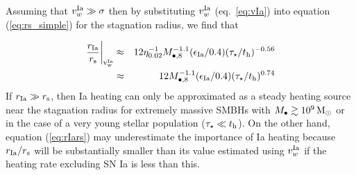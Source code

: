 \documentclass[usenatbib,fleqn]{mn2e}
\begin{document}
Assuming that $v_{w}^{\rm Ia} \gg \sigma$ then by substituting
$v_{w}^{\rm Ia}$ (eq.~\ref{eq:vIa}) into equation (\ref{eq:rs_simple})
for the stagnation radius, we find that

\begin{eqnarray}
  \left.\frac{r_{\rm Ia}}{r_{\rm s}}\right|_{\rm v_{w}^{\rm Ia}}
  &\approx& 12\eta_{0.02}^{-1} M_{\bullet,8}^{-1.1}(\epsilon_{\rm
    Ia}/0.4) (\tau_{\star}/t_{\rm h})^{-0.56} \nonumber \\
  &\approx& 12 M_{\bullet,8}^{-1.1}(\epsilon_{\rm Ia}/0.4) (\tau_{\star}/t_{\rm h})^{0.74}
\label{eq:rIars}
\end{eqnarray}
If $r_{\rm Ia} \gg r_{\rm s}$, then Ia heating can only be
approximated as a steady heating source near the stagnation radius for
extremely massive SMBHs with $M_{\bullet} \gtrsim 10^9 \,{\rm M_\odot}$ or in
the case of a very young stellar population ($\tau_{\star} \ll t_{\rm
h}$).  On the other hand, equation (\ref{eq:rIars}) may underestimate
the importance of Ia heating because $r_{\rm Ia}/r_{\rm s}$ will be
substantially smaller than its value estimated using $v_{w}^{\rm Ia}$
if the heating rate excluding SN Ia is less than this.
\end{document}
